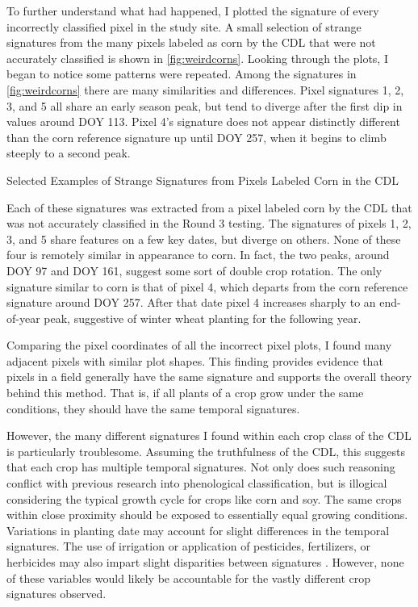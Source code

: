 To further understand what had happened, I plotted the signature of every incorrectly classified pixel in the study site. A small selection of strange signatures from the many pixels labeled as corn by the CDL that were not accurately classified is shown in \cref{fig:weirdcorns}. Looking through the plots, I began to notice some patterns were repeated. Among the signatures in \cref{fig:weirdcorns} there are many similarities and differences. Pixel signatures 1, 2, 3, and 5 all share an early season peak, but tend to diverge after the first dip in values around DOY 113. Pixel 4's signature does not appear distinctly different than the corn reference signature up until DOY 257, when it begins to climb steeply to a second peak.

\begin{ssfigure}
  \centering
  
  \caption{Selected Examples of Strange Signatures from Pixels Labeled Corn in the CDL}
  \label{fig:weirdcorns}
  \medskip
  \small
  Each of these signatures was extracted from a pixel labeled corn by the CDL that was not accurately classified in the Round 3 testing. The signatures of pixels 1, 2, 3, and 5 share features on a few key dates, but diverge on others. None of these four is remotely similar in appearance to corn. In fact, the two peaks, around DOY 97 and DOY 161, suggest some sort of double crop rotation. The only signature similar to corn is that of pixel 4, which departs from the corn reference signature around DOY 257. After that date pixel 4 increases sharply to an end-of-year peak, suggestive of winter wheat planting for the following year.
\end{ssfigure}

Comparing the pixel coordinates of all the incorrect pixel plots, I found many adjacent pixels with similar plot shapes. This finding provides evidence that pixels in a field generally have the same signature and supports the overall theory behind this method. That is, if all plants of a crop grow under the same conditions, they should have the same temporal signatures.

However, the many different signatures I found within each crop class of the CDL is particularly troublesome. Assuming the truthfulness of the CDL, this suggests that each crop has multiple temporal signatures. Not only does such reasoning conflict with previous research into phenological classification, but is illogical considering the typical growth cycle for crops like corn and soy. The same crops within close proximity should be exposed to essentially equal growing conditions. Variations in planting date may account for slight differences in the temporal signatures. The use of irrigation or application of pesticides, fertilizers, or herbicides may also impart slight disparities between signatures \autocites{wardlow2005state-level}{wardlow2007analysis}{wardlow2008large-area}{sakamoto2010a-two-step}. However, none of these variables would likely be accountable for the vastly different crop signatures observed.

